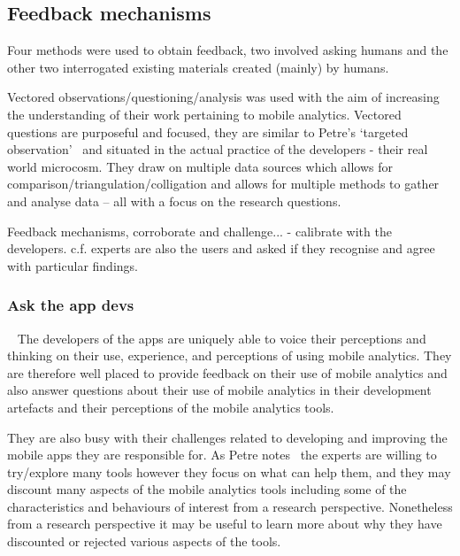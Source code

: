 \subsection{Feedback mechanisms}
Four methods were used to obtain feedback, two involved asking humans and the other two interrogated existing materials created (mainly) by humans.

\label{method-vectored-questions}
Vectored observations/questioning/analysis was used with the aim of increasing the understanding of their work pertaining to mobile analytics. Vectored questions are purposeful and focused, they are similar to Petre's `targeted observation'~\citep[p.234]{petre2009_insights_from_expert_software_design_practice} and situated in the actual practice of the developers - their real world microcosm. They draw on multiple data sources which allows for comparison/triangulation/colligation and allows for multiple methods to gather and analyse data -- all with a focus on the research questions.

Feedback mechanisms, corroborate and challenge... - calibrate with the developers. c.f. experts are also the users and asked if they recognise and agree with particular findings. 


\subsubsection{Ask the app devs}~\label{section-ask-the-app-devs-research-method}
The developers of the apps are uniquely able to voice their perceptions and thinking on their use, experience, and perceptions of using mobile analytics. They are therefore well placed to provide feedback on their use of mobile analytics and also answer questions about their use of mobile analytics in their development artefacts and their perceptions of the mobile analytics tools.

They are also busy with their challenges related to developing and improving the mobile apps they are responsible for. As Petre notes~\citealt{petre2009_insights_from_expert_software_design_practice} the experts are willing to try/explore many tools however they focus on what can help them, and they may discount many aspects of the mobile analytics tools including some of the characteristics and behaviours of interest from a research perspective. Nonetheless from a research perspective it may be useful to learn more about why they have discounted or rejected various aspects of the tools. 

